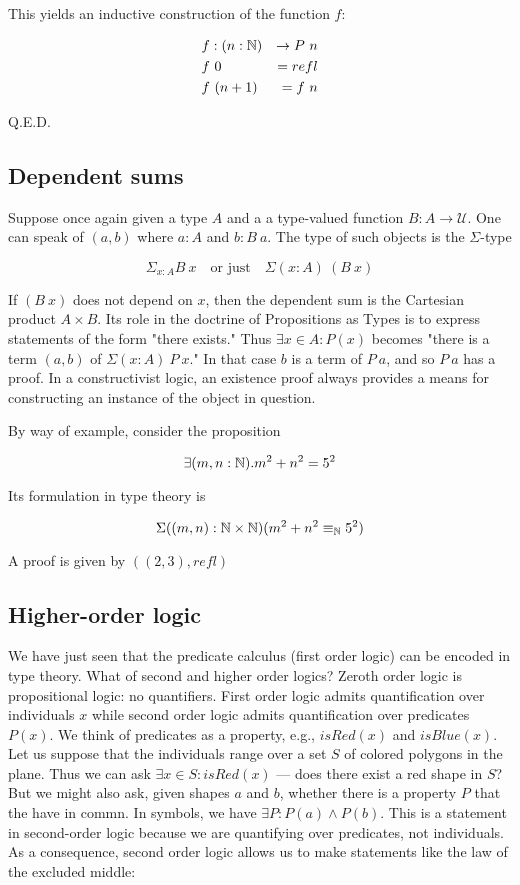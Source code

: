 This yields an inductive construction of the function $f$:

\begin{align}
  &f : (n : \mathbb{N}) &\to P\ n \\
  &f\ 0 &= refl \\
  &f\ (n + 1) &= f\ n
\end{align}

Q.E.D.



\subsection{Dependent sums}

Suppose once again given a type $A$ and a a type-valued function $B: A \to \mathcal{U}$.  One can speak of  $(a, b)$ where $a : A$ and $b : B\ a$.  The type of such objects is the $\Sigma$-type

\begin{equation}
\Sigma_{x: A} B\ x \quad\text{or just}\quad \Sigma (x: A)\ (B\ x)
\end{equation}

If $(B\ x)$ does not depend on $x$, then the dependent sum is the Cartesian product $A\times B$.  Its role in the doctrine of Propositions as Types is to express statements of the form "there exists."  Thus $\exists x \in A: P(x)$ becomes "there is a term $(a,b)$ of $\Sigma (x: A)\ P\ x$."   In that case $b$ is a term of $P\ a$, and so $P\ a$ has a proof. In a constructivist logic, an existence proof always provides a means for constructing an instance of the object in question.

By way of example, consider the proposition 

$$
\exists (m, n : \mathbb{N}) . m^2 + n^2 = 5^2
$$

Its formulation in type theory is

$$
\Sigma ((m, n) : \mathbb{N}\times\mathbb{N}) (m^2 + n^2 \equiv_{\mathbb{N}} 5^2)
$$

A proof is given by $((2,3), refl)$

\subsection{Higher-order logic}

We have just seen that the predicate calculus (first order logic) can be encoded in type theory.  What of second and higher order logics?  Zeroth order logic is propositional logic: no quantifiers.  First order logic admits quantification over individuals $x$  while second order logic admits quantification over predicates $P(x)$.  We think of predicates as a property, e.g., $isRed(x)$ and $isBlue(x)$.  Let us suppose that the individuals range over a set $S$ of colored polygons in the plane. Thus we can ask $\exists x \in S: isRed(x)$ — does there exist a red shape in $S$? But  we might also ask, given shapes $a$ and $b$, whether there is a property $P$ that the have in commn.  In symbols, we have $\exists P : P(a) \wedge P(b)$. This is a statement in second-order logic because we are quantifying over predicates, not individuals.  As a consequence, second order logic allows us to make statements like the law of the excluded middle:

